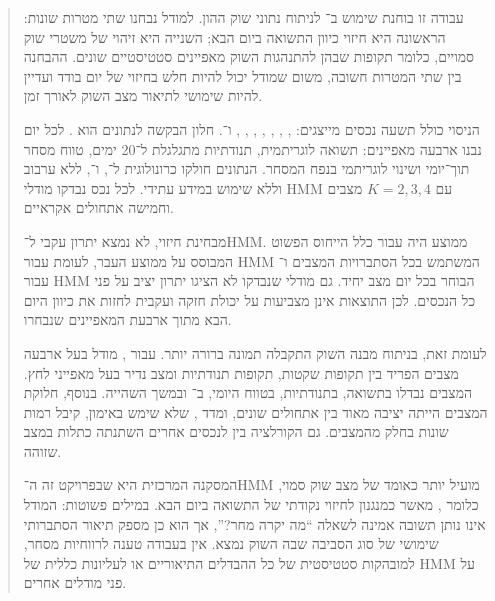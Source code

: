 \begin{abstract}
\begingroup
{}
\setlength{\parskip}{0.90em}

עבודה זו בוחנת שימוש ב־ לניתוח נתוני שוק ההון. למודל נבחנו שתי מטרות שונות: הראשונה היא חיזוי כיוון התשואה ביום הבא; השנייה היא זיהוי של משטרי שוק סמויים, כלומר תקופות שבהן להתנהגות השוק מאפיינים סטטיסטיים שונים. ההבחנה בין שתי המטרות חשובה, משום שמודל יכול להיות חלש בחיזוי של יום בודד ועדיין להיות שימושי לתיאור מצב השוק לאורך זמן.

הניסוי כולל תשעה נכסים מייצגים: , , , , , , ,  ו־. חלון הבקשה לנתונים הוא . לכל יום נבנו ארבעה מאפיינים: תשואה לוגריתמית, תנודתיות מתגלגלת ל־20 ימים, טווח מסחר תוך־יומי ושינוי לוגריתמי בנפח המסחר. הנתונים חולקו כרונולוגית ל־,  ו־, ללא ערבוב וללא שימוש במידע עתידי. לכל נכס נבדקו מודלי HMM עם \(K=2,3,4\) מצבים וחמישה אתחולים אקראיים.

מבחינת חיזוי, לא נמצא יתרון עקבי ל־HMM. ממוצע  היה  עבור כלל הייחוס הפשוט המבוסס על ממוצע העבר, לעומת  עבור HMM המשתמש בכל הסתברויות המצבים ו־ עבור HMM הבוחר בכל יום מצב יחיד. גם מודלי  שנבדקו לא הציגו יתרון יציב על פני כל הנכסים. לכן התוצאות אינן מצביעות על יכולת חזקה ועקבית לחזות את כיוון היום הבא מתוך ארבעת המאפיינים שנבחרו.

לעומת זאת, בניתוח מבנה השוק התקבלה תמונה ברורה יותר. עבור , מודל בעל ארבעה מצבים הפריד בין תקופות שקטות, תקופות תנודתיות ומצב נדיר בעל מאפייני לחץ. המצבים נבדלו בתשואה, בתנודתיות, בטווח היומי, ב־ ובמשך השהייה. בנוסף, חלוקת המצבים הייתה יציבה מאוד בין אתחולים שונים, ומדד , שלא שימש באימון, קיבל רמות שונות בחלק מהמצבים. גם הקורלציה בין  לנכסים אחרים השתנתה כתלות במצב שזוהה.

המסקנה המרכזית היא שבפרויקט זה ה־HMM מועיל יותר כאומד של מצב שוק סמוי, כלומר , מאשר כמנגנון לחיזוי נקודתי של התשואה ביום הבא. במילים פשוטות: המודל אינו נותן תשובה אמינה לשאלה ``מה יקרה מחר?'', אך הוא כן מספק תיאור הסתברותי שימושי של סוג הסביבה שבה השוק נמצא. אין בעבודה טענה לרווחיות מסחר, למובהקות סטטיסטית של כל ההבדלים התיאוריים או לעליונות כללית של HMM על פני מודלים אחרים.

\endgroup
\end{abstract}

